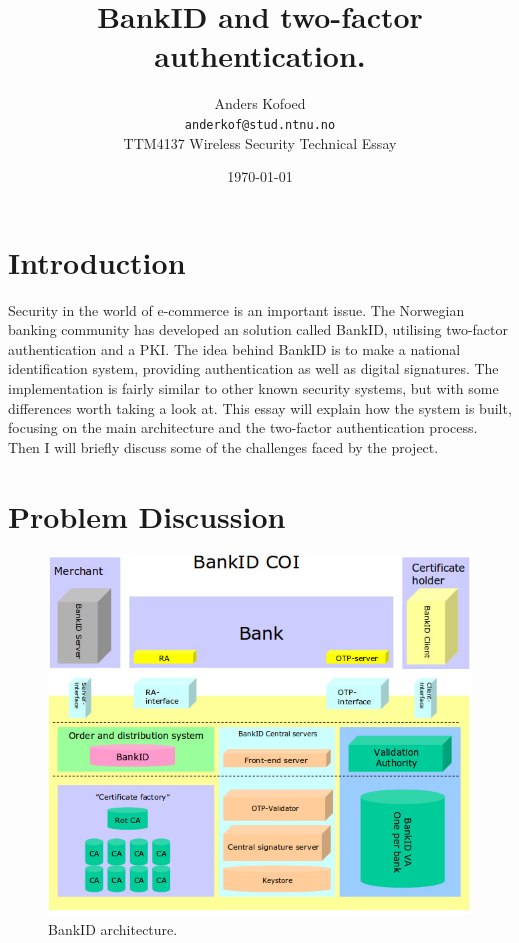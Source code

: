 \documentclass[a4paper,11pt]{article}
\title{BankID and two-factor authentication.}
\author{Anders Kofoed \\
	\texttt{anderkof@stud.ntnu.no}\\
	TTM4137 Wireless Security Technical Essay}
\date{\today}
\begin{document}
\maketitle

\section{Introduction}
Security in the world of e-commerce is an important issue. The Norwegian banking community has developed an solution called BankID, utilising two-factor authentication and a PKI. The idea behind BankID is to make a national identification system, providing authentication as well as digital signatures. The implementation is fairly similar to other known security systems, but with some differences worth taking a look at. This essay will explain how the system is built, focusing on the main architecture and the two-factor authentication process. Then I will briefly discuss some of the challenges faced by the project. 


\section{Problem Discussion}
\begin{figure}
  \centering
  \includegraphics[scale=0.35]{architecture} %
  \vspace{-0.2cm}
  \caption{BankID architecture.}
  \label{fig:arch}
\end{figure}
\end{document}
